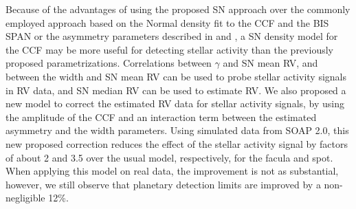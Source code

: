 \documentclass{aa}
\begin{document}
Because of the advantages of using the proposed SN approach over the commonly employed approach based on the Normal density fit to the CCF and the BIS SPAN or the asymmetry parameters described in \citet{Boisse-2011} and \citet{Figueira-2013}, a SN density model for the CCF may be more useful for detecting stellar activity than the previously proposed parametrizations.
Correlations between $\gamma$ and SN mean RV, and between the width and SN mean RV can be used to probe stellar activity signals in RV data, and SN median RV can be used to estimate RV.
We also proposed a new model to correct the estimated RV data for stellar activity signals, by using the amplitude of the CCF and an interaction term between the estimated asymmetry and the width parameters. Using simulated data from SOAP 2.0, this new proposed correction reduces the effect of the stellar activity signal by factors of about 2 and 3.5 over the usual model, respectively, for the facula and spot. When applying this model on real data, the improvement is not as substantial, however, we still observe that planetary detection limits are improved by a non-negligible 12\%.

\end{document}
